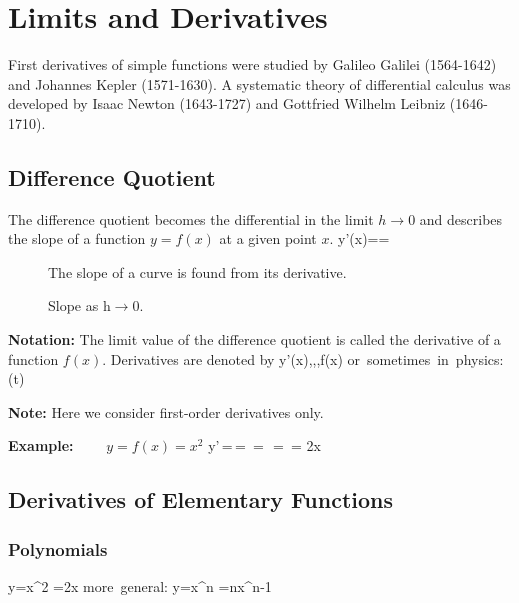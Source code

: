 

\section{Limits and Derivatives}\label{diff}
First derivatives of simple functions were studied by Galileo
Galilei (1564-1642) and Johannes Kepler (1571-1630). A systematic
theory of differential calculus was developed by Isaac Newton
(1643-1727) and Gottfried Wilhelm Leibniz (1646-1710).

\subsection{Difference Quotient}
The difference quotient becomes the differential in the limit
$h\rightarrow 0$ and describes the slope of a function $y=f(x)$
at a given point $x$.
\bnn y'(x)==  \enn

\begin{figure}[!h]
    \centerline{\epsfxsize=10cm \epsfysize=9cm } \svs
    \caption{The slope of a curve is found from its derivative.} \label{fig20}
\end{figure} \vs

\begin{figure}[!h]
    \centerline{\epsfxsize=10cm } \svs
    \caption{Slope as h$\rightarrow 0$.} \label{fig21}
\end{figure} \svs

{\bf Notation:} The limit value of the difference quotient is called the
derivative of a function $f(x)$. Derivatives are denoted by
\bnn y'(x)\;,\;\;,\;\;,\;f(x) \qquad
\mbox{or sometimes in physics:} \;\; (t) \enn

{\bf Note:} Here we consider first-order derivatives only.

\vs
{\bf Example:}  $\qquad y = f(x) =x^2$
\bnn
y'\,=\,= 
\,=\, 
\,=\,  = 2x
\enn \vs

\subsection{Derivatives of Elementary Functions}

\subsubsection{Polynomials}
\vspace*{-2mm}\bnn y=x^2 \quad \rightarrow \quad {}=2x
\qquad \qquad \qquad \mbox{more general:} \quad
y=x^n \quad \rightarrow \quad {}=nx^{n-1} \enn

